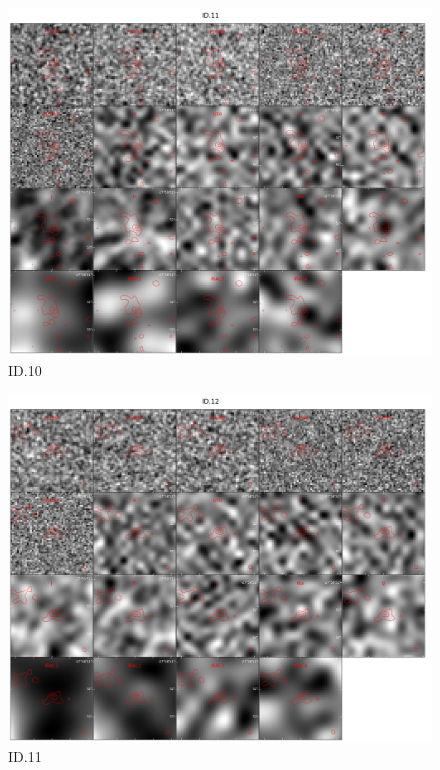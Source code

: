 \begin{figure}[tbp]
\centering \includegraphics[width=120mm]{Matched/ASPECS_Cutout_10.jpg}
\caption{ID.10}
\label{fig:Match_Three}
\end{figure}

\begin{figure}[tbp]
\centering \includegraphics[width=120mm]{Matched/ASPECS_Cutout_11.jpg}
\caption{ID.11}
\label{fig:Match_Three}
\end{figure}


